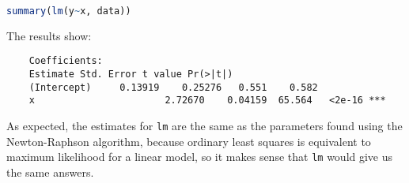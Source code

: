 \documentclass[12pt,letterpaper]{article}
\begin{document}
\begin{lstlisting}[language=R]
	summary(lm(y~x, data)) \end{lstlisting}

\noindent The results show: \\

 \begin{verbatim} 
 	Coefficients:            
 	Estimate Std. Error t value Pr(>|t|)    
 	(Intercept)  	0.13919    0.25276   0.551    0.582   
 	x            			2.72670    0.04159  65.564   <2e-16 ***\end{verbatim}
 
 \noindent As expected, the estimates for \texttt{lm} are the same as the parameters found using the Newton-Raphson algorithm, because ordinary least squares is equivalent to maximum likelihood for a linear model, so it makes sense that \texttt{lm} would give us the same answers. \\
 
\end{document}
